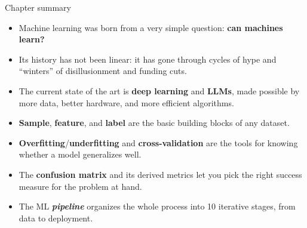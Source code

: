 \documentclass[aspectratio=169]{beamer}
\begin{document}
\begin{frame}{Chapter summary}
  \small
  \begin{itemize}
    \item Machine learning was born from a very simple question: \textbf{can machines learn?}
    \item Its history has not been linear: it has gone through cycles of hype and ``winters'' of disillusionment and funding cuts.
    \item The current state of the art is \textbf{deep learning} and \textbf{LLMs}, made possible by more data, better hardware, and more efficient algorithms.
    \item \textbf{Sample}, \textbf{feature}, and \textbf{label} are the basic building blocks of any dataset.
    \item \textbf{Overfitting}/\textbf{underfitting} and \textbf{cross-validation} are the tools for knowing whether a model generalizes well.
    \item The \textbf{confusion matrix} and its derived metrics let you pick the right success measure for the problem at hand.
    \item The ML \textbf{\textit{pipeline}} organizes the whole process into 10 iterative stages, from data to deployment.
  \end{itemize}
\end{frame}
\end{document}
